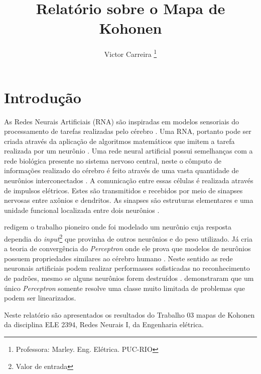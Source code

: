 \documentclass[journal, a4paper]{IEEEtran}
\begin{document}
	\title{Relatório sobre o Mapa de Kohonen}
	\author{Victor Carreira
	\thanks{Professora: Marley. Eng. Elétrica. PUC-RIO}}
	\maketitle

\begin{abstract}

\end{abstract}


\section{Introdução}
    As Redes Neurais Artificiais (RNA) são inspiradas em modelos sensoriais do processamento de tarefas realizadas pelo cérebro \citep{Hagan1996}. Uma RNA, portanto pode ser criada através da aplicação de algoritmos matemáticos que imitem a tarefa realizada por um neurônio \citep{Nedjah2016}. Uma rede neural artificial possui semelhanças com a rede biológica presente no sistema nervoso central, neste o cômputo de informações realizado do cérebro é feito através de uma vasta quantidade de neurônios interconectados \citep{Feldman1988,Poulton2002}. A comunicação entre essas células é realizada através de impulsos elétricos. Estes são transmitidos e recebidos por meio de sinapses nervosas entre axônios e dendritos. As sinapses são estruturas elementares e uma unidade funcional localizada entre dois neurônios \citep{Krogh2008}.

	\citet{McCulloch1943} redigem o trabalho pioneiro onde foi modelado um neurônio cuja resposta dependia do \textit{input}\footnote{Valor de entrada} que provinha de outros neurônios e do peso utilizado.  Já \citet{Rosenblatt1962} cria a teoria de convergência do \textit{Perceptron} onde ele prova que modelos de neurônios possuem propriedades similares ao cérebro humano \citep{Kanal2001}. Neste sentido as rede neuronais artificiais podem realizar performasses sofisticadas no reconhecimento de padrões, mesmo se alguns neurônios forem destruídos \citep{Levy1997}. \citet{Minsky1969} demonstraram que um único  \textit{Perceptron} somente resolve uma classe muito limitada de problemas que podem ser linearizados.
	

	
	Neste relatório são apresentados os resultados do Trabalho 03 mapas de Kohonen da disciplina ELE 2394, Redes Neurais I, da Engenharia elétrica.
	
\end{document}
